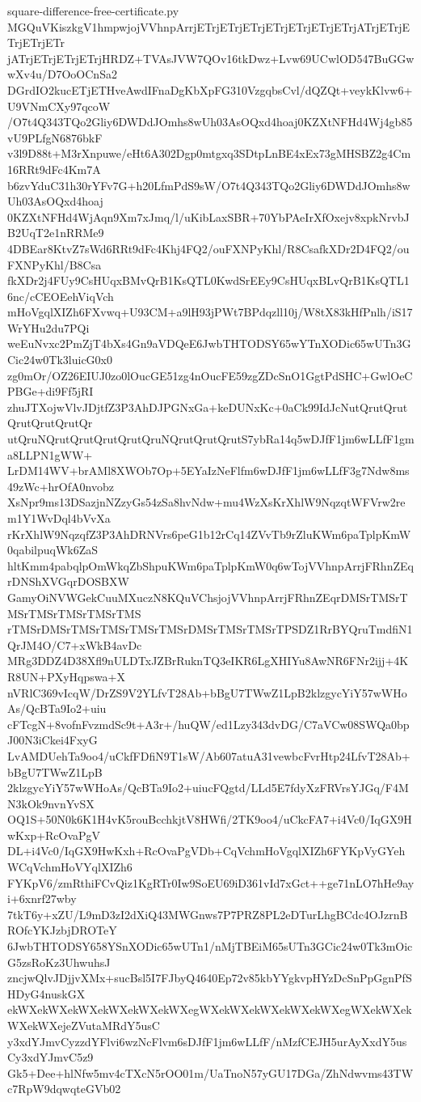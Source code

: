 \documentclass[11pt]{article}
\theoremstyle{definition}
\theoremstyle{remark}
\begin{document}
\begin{filecontents*}[overwrite]{square-difference-free-certificate.py}
MGQuVKiszkgV1hmpwjojVVhnpArrjETrjETrjETrjETrjETrjETrjETrjATrjETrjETrjETrjETr
jATrjETrjETrjETrjHRDZ+TVAsJVW7QOv16tkDwz+Lvw69UCwlOD547BuGGwwXv4u/D7OoOCnSa2
DGrdIO2kucETjETHveAwdIFnaDgKbXpFG310VzgqbsCvl/dQZQt+veykKlvw6+U9VNmCXy97qcoW
/O7t4Q343TQo2Gliy6DWDdJOmhs8wUh03AsOQxd4hoaj0KZXtNFHd4Wj4gb85vU9PLfgN6876bkF
v3l9D88t+M3rXnpuwe/eHt6A302Dgp0mtgxq3SDtpLnBE4xEx73gMHSBZ2g4Cm16RRt9dFc4Km7A
b6zvYduC31h30rYFv7G+h20LfmPdS9sW/O7t4Q343TQo2Gliy6DWDdJOmhs8wUh03AsOQxd4hoaj
0KZXtNFHd4WjAqn9Xm7xJmq/l/uKibLaxSBR+70YbPAeIrXfOxejv8xpkNrvbJB2UqT2e1nRRMe9
4DBEar8KtvZ7sWd6RRt9dFc4Khj4FQ2/ouFXNPyKhl/R8CsafkXDr2D4FQ2/ouFXNPyKhl/B8Csa
fkXDr2j4FUy9CsHUqxBMvQrB1KsQTL0KwdSrEEy9CsHUqxBLvQrB1KsQTL16nc/cCEOEehViqVch
mHoVgqlXIZh6FXvwq+U93CM+a9lH93jPWt7BPdqzll10j/W8tX83kHfPnlh/iS17WrYHu2du7PQi
weEuNvxc2PmZjT4bXs4Gn9aVDQeE6JwbTHTODSY65wYTnXODic65wUTn3GCic24w0Tk3luicG0x0
zg0mOr/OZ26EIUJ0zo0lOucGE51zg4nOucFE59zgZDcSnO1GgtPdSHC+GwlOeCPBGe+di9Ff5jRI
zhuJTXojwVlvJDjtfZ3P3AhDJPGNxGa+keDUNxKc+0aCk99IdJcNutQrutQrutQrutQrutQrutQr
utQruNQrutQrutQrutQrutQruNQrutQrutQrutS7ybRa14q5wDJfF1jm6wLLfF1gma8LLPN1gWW+
LrDM14WV+brAMl8XWOb7Op+5EYaIzNeFlfm6wDJfF1jm6wLLfF3g7Ndw8ms49zWc+hrOfA0nvobz
XsNpr9ms13DSazjnNZzyGs54zSa8hvNdw+mu4WzXsKrXhlW9NqzqtWFVrw2rem1Y1WvDql4bVvXa
rKrXhlW9NqzqfZ3P3AhDRNVrs6peG1b12rCq14ZVvTb9rZluKWm6paTplpKmW0qabilpuqWk6ZaS
hltKmm4pabqlpOmWkqZbShpuKWm6paTplpKmW0q6wTojVVhnpArrjFRhnZEqrDNShXVGqrDOSBXW
GamyOiNVWGekCuuMXuczN8KQuVChsjojVVhnpArrjFRhnZEqrDMSrTMSrTMSrTMSrTMSrTMSrTMS
rTMSrDMSrTMSrTMSrTMSrTMSrDMSrTMSrTMSrTPSDZ1RrBYQruTmdfiN1QrJM4O/C7+xWkB4avDc
MRg3DDZ4D38Xfl9nULDTxJZBrRuknTQ3eIKR6LgXHIYu8AwNR6FNr2ijj+4KR8UN+PXyHqpswa+X
nVRlC369vIcqW/DrZS9V2YLfvT28Ab+bBgU7TWwZ1LpB2klzgycYiY57wWHoAs/QcBTa9Io2+uiu
cFTcgN+8vofnFvzmdSc9t+A3r+/huQW/ed1Lzy343dvDG/C7aVCw08SWQa0bpJ00N3iCkei4FxyG
LvAMDUehTa9oo4/uCkfFDfiN9T1sW/Ab607atuA31vewbcFvrHtp24LfvT28Ab+bBgU7TWwZ1LpB
2klzgycYiY57wWHoAs/QcBTa9Io2+uiucFQgtd/LLd5E7fdyXzFRVrsYJGq/F4MN3kOk9nvnYvSX
OQ1S+50N0k6K1H4vK5rouBcchkjtV8HWfi/2TK9oo4/uCkcFA7+i4Vc0/IqGX9HwKxp+RcOvaPgV
DL+i4Vc0/IqGX9HwKxh+RcOvaPgVDb+CqVchmHoVgqlXIZh6FYKpVyGYehWCqVchmHoVYqlXIZh6
FYKpV6/zmRthiFCvQiz1KgRTr0Iw9SoEU69iD361vId7xGct++ge71nLO7hHe9ayi+6xnrf27wby
7tkT6y+xZU/L9mD3zI2dXiQ43MWGnws7P7PRZ8PL2eDTurLhgBCdc4OJzrnBROfcYKJzbjDROTeY
6JwbTHTODSY658YSnXODic65wUTn1/nMjTBEiM65sUTn3GCic24w0Tk3mOicG5zsRoKz3UhwuhsJ
zncjwQlvJDjjvXMx+sucBsl5I7FJbyQ4640Ep72v85kbYYgkvpHYzDcSnPpGgnPfSHDyG4nuskGX
ekWXekWXekWXekWXekWXekWXegWXekWXekWXekWXekWXegWXekWXekWXekWXejeZVutaMRdY5usC
y3xdYJmvCyzzdYFlvi6wzNcFlvm6sDJfF1jm6wLLfF/nMzfCEJH5urAyXxdY5usCy3xdYJmvC5z9
Gk5+Dee+hlNfw5mv4cTXcN5rOO01m/UaTnoN57yGU17DGa/ZhNdwvms43TWc7RpW9dqwqteGVb02

\end{filecontents*}
\end{document}
